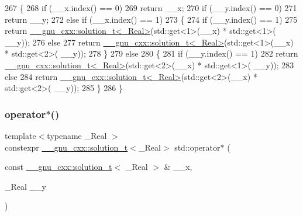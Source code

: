 \begin{DoxyCode}
267     \{
268       \textcolor{keywordflow}{if} (\_\_x.index() == 0)
269         \textcolor{keywordflow}{return} \_\_x;
270       \textcolor{keywordflow}{if} (\_\_y.index() == 0)
271         \textcolor{keywordflow}{return} \_\_y;
272       \textcolor{keywordflow}{else} \textcolor{keywordflow}{if} (\_\_x.index() == 1)
273         \{
274           \textcolor{keywordflow}{if} (\_\_y.index() == 1)
275             \textcolor{keywordflow}{return} \hyperlink{namespace____gnu__cxx_ae20ea642de50eb361074c62676b0159c}{\_\_gnu\_cxx::solution\_t<\_Real>}(std::get<1>(\_\_x) * std::get<1>(
      \_\_y));
276           \textcolor{keywordflow}{else}
277             \textcolor{keywordflow}{return} \hyperlink{namespace____gnu__cxx_ae20ea642de50eb361074c62676b0159c}{\_\_gnu\_cxx::solution\_t<\_Real>}(std::get<1>(\_\_x) * std::get<2>(
      \_\_y));
278         \}
279       \textcolor{keywordflow}{else}
280         \{
281           \textcolor{keywordflow}{if} (\_\_y.index() == 1)
282             \textcolor{keywordflow}{return} \hyperlink{namespace____gnu__cxx_ae20ea642de50eb361074c62676b0159c}{\_\_gnu\_cxx::solution\_t<\_Real>}(std::get<2>(\_\_x) * std::get<1>(
      \_\_y));
283           \textcolor{keywordflow}{else}
284             \textcolor{keywordflow}{return} \hyperlink{namespace____gnu__cxx_ae20ea642de50eb361074c62676b0159c}{\_\_gnu\_cxx::solution\_t<\_Real>}(std::get<2>(\_\_x) * std::get<2>(
      \_\_y));
285         \}
286     \}
\end{DoxyCode}
\mbox{\label{namespacestd_a13970e4b2bf6680ae3284c0f1117ea4d}} 
\subsubsection{\texorpdfstring{operator$\ast$()}{operator*()}\hspace{0.1cm}{\footnotesize\ttfamily [2/5]}}
{\footnotesize\ttfamily template$<$typename \+\_\+\+Real $>$ \\
constexpr \hyperlink{namespace____gnu__cxx_ae20ea642de50eb361074c62676b0159c}{\+\_\+\+\_\+gnu\+\_\+cxx\+::solution\+\_\+t}$<$\+\_\+\+Real$>$ std\+::operator$\ast$ (\begin{DoxyParamCaption}\item[{const \hyperlink{namespace____gnu__cxx_ae20ea642de50eb361074c62676b0159c}{\+\_\+\+\_\+gnu\+\_\+cxx\+::solution\+\_\+t}$<$ \+\_\+\+Real $>$ \&}]{\+\_\+\+\_\+x,  }\item[{\+\_\+\+Real}]{\+\_\+\+\_\+y }\end{DoxyParamCaption})}




